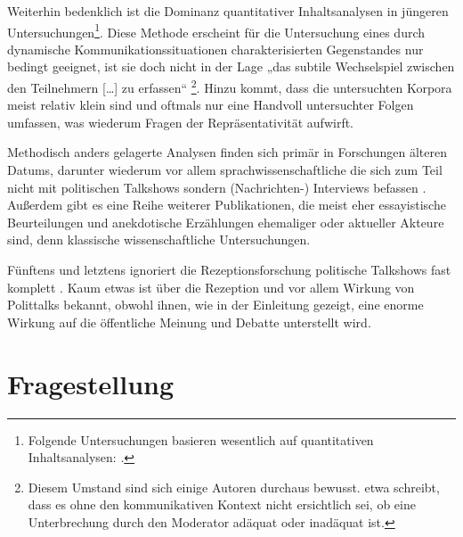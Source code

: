 Weiterhin bedenklich ist die Dominanz quantitativer Inhaltsanalysen in jüngeren Untersuchungen\footnote{Folgende Untersuchungen basieren wesentlich auf quantitativen Inhaltsanalysen: \cite{schrottElefantenUnterSich1996, schultzJournalistenTalkPolitischeKommunikation2002, schultzModerationPolitischerGesprachsrunden2004, bockPolitainmentImDeutschen2009}.}. Diese Methode erscheint für die Untersuchung eines durch dynamische Kommunikationssituationen charakterisierten Gegenstandes nur bedingt geeignet, ist sie doch nicht in der Lage „das subtile Wechselspiel zwischen den Teilnehmern [\ldots] zu erfassen“ \parencite[104]{plakeTalkshowsIndustrialisierungKommunikation1999}\footnote{Diesem Umstand sind sich einige Autoren durchaus bewusst. \parencite[305]{schultzModerationPolitischerGesprachsrunden2004} etwa schreibt, dass es ohne den kommunikativen Kontext nicht ersichtlich sei, ob eine Unterbrechung durch den Moderator adäquat oder inadäquat ist.}. Hinzu kommt, dass die untersuchten Korpora meist relativ klein sind und oftmals nur eine Handvoll untersuchter Folgen umfassen, was wiederum Fragen der Repräsentativität aufwirft.

Methodisch anders gelagerte Analysen finden sich primär in Forschungen älteren Datums, darunter wiederum vor allem sprachwissenschaftliche die sich zum Teil nicht mit politischen Talkshows sondern (Nachrichten-) Interviews befassen \parencite{roettgerInterviewstileUndNeue1996, heritageAnalyzingNewsInterviews1989, hoffmannPolitischeFernsehinterviewsEmpirische1982, brinkerThematischeMusterUnd1988, hollyPolitischeFernsehdiskussionenZur1986}. Außerdem gibt es eine Reihe weiterer Publikationen, die meist eher essayistische Beurteilungen \parencite{rossumMeineSonntageMit2004, bommariusUebersaettigungsbeilageExpertenUnd2005, brunstJeSpaeterAbend2005} und anekdotische Erzählungen ehemaliger oder aktueller Akteure \parencite{michelPolitTalkshowsBuehnenMacht2009} sind, denn klassische wissenschaftliche Untersuchungen.

Fünftens und letztens ignoriert die Rezeptionsforschung politische Talkshows fast komplett \parencite[16]{schichaInszenierungPolitischerDiskurse2002}. Kaum etwas ist über die Rezeption und vor allem Wirkung von Polittalks bekannt, obwohl ihnen, wie in der Einleitung gezeigt, eine enorme Wirkung auf die öffentliche Meinung und Debatte unterstellt wird.

\section{Fragestellung}

